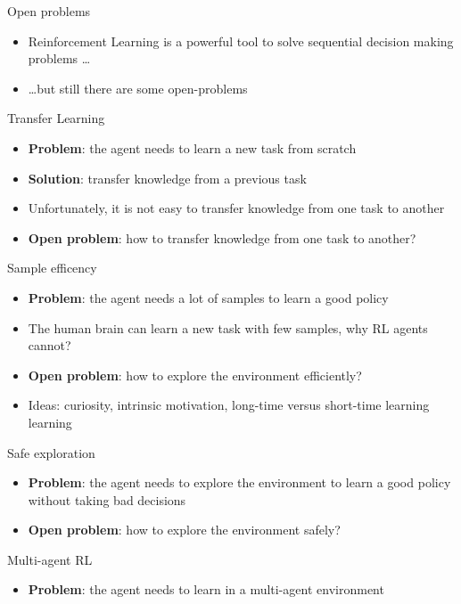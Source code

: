 \documentclass[presentation, 9pt]{beamer}\mode<presentation>{\usetheme{AMSBolognaFC}}
\begin{document}
\begin{frame}[allowframebreaks]{Open problems}
	\begin{itemize}
		\item Reinforcement Learning is a powerful tool to solve sequential decision making problems \dots
		\item \dots but still there are some open-problems
	\end{itemize}
	\begin{exampleblock}{Transfer Learning}
		\begin{itemize}
			\item \textbf{Problem}: the agent needs to learn a new task from scratch
			\item \textbf{Solution}: transfer knowledge from a previous task
			\item Unfortunately, it is not easy to transfer knowledge from one task to another
			\item \textbf{Open problem}: how to transfer knowledge from one task to another?
		\end{itemize}
	\end{exampleblock}
	\begin{exampleblock}{Sample efficency}
		\begin{itemize}
			\item \textbf{Problem}: the agent needs a lot of samples to learn a good policy
			\item The human brain can learn a new task with few samples, why RL agents cannot?
			\item \textbf{Open problem}: how to explore the environment efficiently?
			\item Ideas: curiosity, intrinsic motivation, long-time versus short-time learning learning
		\end{itemize}
	\end{exampleblock}
	\begin{exampleblock}{Safe exploration}
		\begin{itemize}
			\item \textbf{Problem}: the agent needs to explore the environment to learn a good policy without taking bad decisions
			\item \textbf{Open problem}: how to explore the environment safely?
		\end{itemize}		
	\end{exampleblock}
	\begin{exampleblock}{Multi-agent RL}
		\begin{itemize}
			\item \textbf{Problem}: the agent needs to learn in a multi-agent environment

\end{itemize}
\end{exampleblock}
\end{frame}
\end{document}
